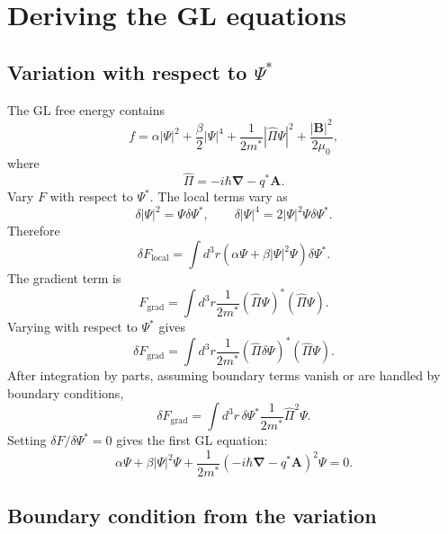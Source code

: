 \documentclass[11pt]{article}
\numberwithin{equation}{section}
\newcommand{\Avec}{\bm{A}}
\newcommand{\Bvec}{\bm{B}}
\renewcommand{\grad}{\bm{\nabla}}
\newcommand{\Ord}{\Psi}
\begin{document}
\section{Deriving the GL equations}

\subsection{Variation with respect to $\Psi^*$}

The GL free energy contains
\begin{equation}
f=\alpha|\Ord|^2+\frac{\beta}{2}|\Ord|^4+\frac{1}{2m^*}|\hat{\Pi}\Ord|^2+\frac{|\Bvec|^2}{2\mu_0},
\end{equation}
where
\begin{equation}
\hat{\Pi}=-i\hbar\grad-q^*\Avec.
\end{equation}
Vary $F$ with respect to $\Ord^*$. The local terms vary as
\begin{equation}
\delta |\Ord|^2=\Ord\delta\Ord^*,
\qquad
\delta |\Ord|^4=2|\Ord|^2\Ord\delta\Ord^*.
\end{equation}
Therefore
\begin{equation}
\delta F_{\mathrm{local}}=\int d^3r\left(\alpha\Ord+\beta|\Ord|^2\Ord\right)\delta\Ord^*.
\end{equation}
The gradient term is
\begin{equation}
F_{\mathrm{grad}}=\int d^3r\frac{1}{2m^*}(\hat{\Pi}\Ord)^*(\hat{\Pi}\Ord).
\end{equation}
Varying with respect to $\Ord^*$ gives
\begin{equation}
\delta F_{\mathrm{grad}}=\int d^3r\frac{1}{2m^*}(\hat{\Pi}\delta\Ord)^*(\hat{\Pi}\Ord).
\end{equation}
After integration by parts, assuming boundary terms vanish or are handled by boundary conditions,
\begin{equation}
\delta F_{\mathrm{grad}}=\int d^3r\,\delta\Ord^*\frac{1}{2m^*}\hat{\Pi}^2\Ord.
\end{equation}
Setting $\delta F/\delta\Ord^*=0$ gives the first GL equation:
\begin{equation}
\boxed{\alpha\Ord+\beta|\Ord|^2\Ord+\frac{1}{2m^*}\left(-i\hbar\grad-q^*\Avec\right)^2\Ord=0.}
\label{eq:first_gl}
\end{equation}

\subsection{Boundary condition from the variation}
\end{document}
